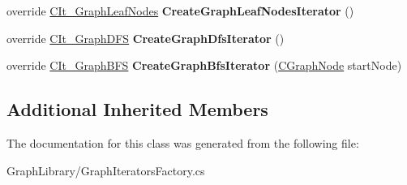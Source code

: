 \begin{DoxyCompactItemize}
\item 
\hypertarget{class_graph_library_1_1_c_graph_iterators_factory_aefe770767765599b969b5202f340dd9a}{}override \hyperlink{class_graph_library_1_1_c_it___graph_leaf_nodes}{C\+It\+\_\+\+Graph\+Leaf\+Nodes} {\bfseries Create\+Graph\+Leaf\+Nodes\+Iterator} ()\label{class_graph_library_1_1_c_graph_iterators_factory_aefe770767765599b969b5202f340dd9a}

\item 
\hypertarget{class_graph_library_1_1_c_graph_iterators_factory_afe9896022dd8c954737aee30bec66fbe}{}override \hyperlink{class_graph_library_1_1_c_it___graph_d_f_s}{C\+It\+\_\+\+Graph\+D\+F\+S} {\bfseries Create\+Graph\+Dfs\+Iterator} ()\label{class_graph_library_1_1_c_graph_iterators_factory_afe9896022dd8c954737aee30bec66fbe}

\item 
\hypertarget{class_graph_library_1_1_c_graph_iterators_factory_a2c970fc96edbb626f1b6875413d473f4}{}override \hyperlink{class_graph_library_1_1_c_it___graph_b_f_s}{C\+It\+\_\+\+Graph\+B\+F\+S} {\bfseries Create\+Graph\+Bfs\+Iterator} (\hyperlink{class_graph_library_1_1_c_graph_node}{C\+Graph\+Node} start\+Node)\label{class_graph_library_1_1_c_graph_iterators_factory_a2c970fc96edbb626f1b6875413d473f4}

\end{DoxyCompactItemize}
\subsection*{Additional Inherited Members}


The documentation for this class was generated from the following file\+:\begin{DoxyCompactItemize}
\item 
Graph\+Library/Graph\+Iterators\+Factory.\+cs\end{DoxyCompactItemize}
